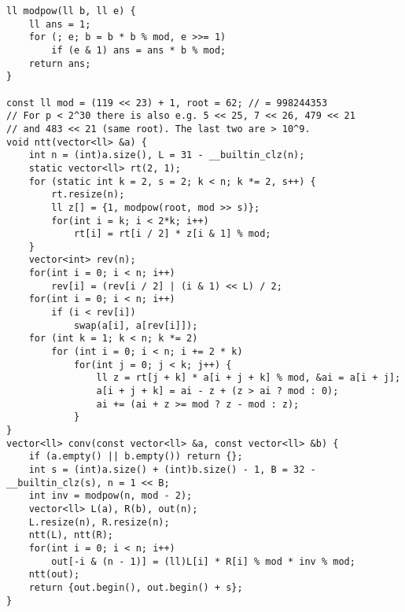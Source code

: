 \documentclass[landscape, 8pt, a4paper, oneside]{extarticle}
\begin{document}
\begin{multicols}{3}
\begin{verbatim}
ll modpow(ll b, ll e) {
	ll ans = 1;
	for (; e; b = b * b % mod, e >>= 1)
		if (e & 1) ans = ans * b % mod;
	return ans;
}

const ll mod = (119 << 23) + 1, root = 62; // = 998244353
// For p < 2^30 there is also e.g. 5 << 25, 7 << 26, 479 << 21
// and 483 << 21 (same root). The last two are > 10^9.
void ntt(vector<ll> &a) {
	int n = (int)a.size(), L = 31 - __builtin_clz(n);
	static vector<ll> rt(2, 1);
	for (static int k = 2, s = 2; k < n; k *= 2, s++) {
		rt.resize(n);
		ll z[] = {1, modpow(root, mod >> s)};
		for(int i = k; i < 2*k; i++)
			rt[i] = rt[i / 2] * z[i & 1] % mod;
	}
	vector<int> rev(n);
	for(int i = 0; i < n; i++)
		rev[i] = (rev[i / 2] | (i & 1) << L) / 2;
	for(int i = 0; i < n; i++)
		if (i < rev[i])
			swap(a[i], a[rev[i]]);
	for (int k = 1; k < n; k *= 2)
		for (int i = 0; i < n; i += 2 * k)
			for(int j = 0; j < k; j++) {
				ll z = rt[j + k] * a[i + j + k] % mod, &ai = a[i + j];
				a[i + j + k] = ai - z + (z > ai ? mod : 0);
				ai += (ai + z >= mod ? z - mod : z);
			}
}
vector<ll> conv(const vector<ll> &a, const vector<ll> &b) {
	if (a.empty() || b.empty()) return {};
	int s = (int)a.size() + (int)b.size() - 1, B = 32 - __builtin_clz(s), n = 1 << B;
	int inv = modpow(n, mod - 2);
	vector<ll> L(a), R(b), out(n);
	L.resize(n), R.resize(n);
	ntt(L), ntt(R);
	for(int i = 0; i < n; i++)
		out[-i & (n - 1)] = (ll)L[i] * R[i] % mod * inv % mod;
	ntt(out);
	return {out.begin(), out.begin() + s};
}
\end{verbatim}

\end{multicols}
\end{document}
